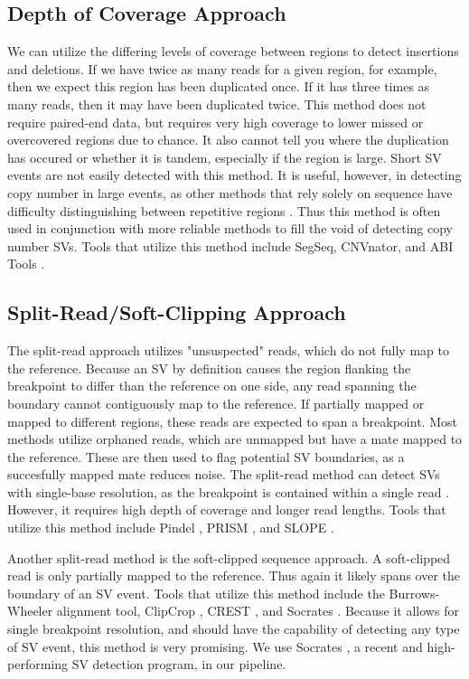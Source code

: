 \documentclass{easychithesis}
\begin{document}
\subsection{Depth of Coverage Approach}
We can utilize the differing levels of coverage between regions to detect insertions and deletions. If we have twice as many reads for a given region, for example, then we expect this region has been duplicated once. If it has three times as many reads, then it may have been duplicated twice. This method does not require paired-end data, but requires very high coverage to lower missed or overcovered regions due to chance. It also cannot tell you where the duplication has occured or whether it is tandem, especially if the region is large\cite{suzuki2011clipcrop}. Short SV events are not easily detected with this method. It is useful, however, in detecting copy number in large events, as other methods that rely solely on sequence have difficulty distinguishing between repetitive regions \cite{suzuki2011clipcrop}. Thus this method is often used in conjunction with more reliable methods to fill the void of detecting copy number SVs. Tools that utilize this method include SegSeq, CNVnator, and ABI Tools \cite{suzuki2011clipcrop}.

\subsection{Split-Read/Soft-Clipping Approach}
The split-read approach utilizes "unsuspected" reads, which do not fully map to the reference. Because an SV by definition causes the region flanking the breakpoint to differ than the reference on one side, any read spanning the boundary cannot contiguously map to the reference. If partially mapped or mapped to different regions, these reads are expected to span a breakpoint. Most methods utilize orphaned reads, which are unmapped but have a mate mapped to the reference. These are then used to flag potential SV boundaries, as a succesfully mapped mate reduces noise. The split-read method can detect SVs with single-base resolution, as the breakpoint is contained within a single read \cite{schroder2014socrates, suzuki2011clipcrop}. However, it requires high depth of coverage and longer read lengths\cite{suzuki2011clipcrop}. Tools that utilize this method include Pindel \cite{ye2009pindel}, PRISM \cite{jiang2012prism}, and SLOPE \cite{abel2010slope}.

Another split-read method is the soft-clipped sequence approach. A soft-clipped read is only partially mapped to the reference. Thus again it likely spans over the boundary of an SV event. Tools that utilize this method include the Burrows-Wheeler alignment tool, ClipCrop \cite{suzuki2011clipcrop}, CREST \cite{wang2011crest}, and Socrates \cite{schroder2014socrates}. Because it allows for single breakpoint resolution, and should have the capability of detecting any type of SV event, this method is very promising. We use Socrates \cite{schroder2014socrates}, a recent and high-performing SV detection program, in our pipeline.
\end{document}
